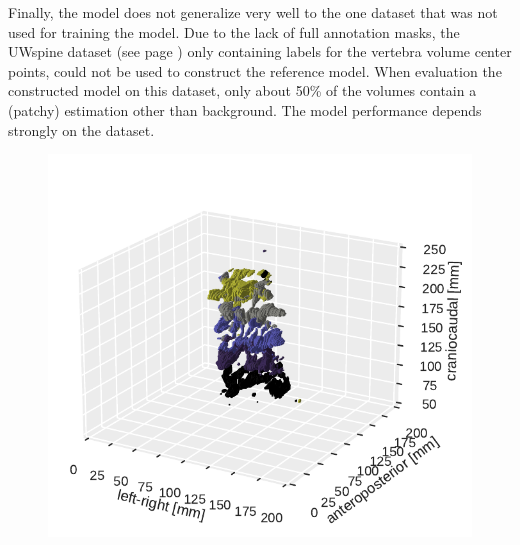 \par{
Finally, the model does not generalize very well to the one dataset that was not used for training the model.
Due to the lack of full annotation masks, the UWspine dataset (see page \pageref{sec:UWspine}) only containing labels for the vertebra volume center points,  could not be used to construct the reference model.
When evaluation the constructed model on this dataset, only about 50\% of the volumes contain a (patchy) estimation other than background.
The model performance depends strongly on the dataset. 
}

\begin{figure}
    \centering
    \begin{minipage}{.45\textwidth}
        \includegraphics[width=.99\textwidth]{images/UW_result.pdf}
    \end{minipage}%
    \begin{minipage}{.45\textwidth}

\end{minipage}
\end{figure}
